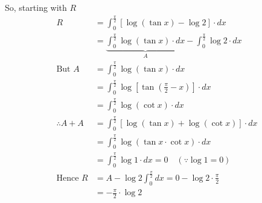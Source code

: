 \documentclass[14pt,fleqn]{extarticle}
\begin{document}
So, starting with $R$ 
\begin{align}
R &= \int_0^{\frac\pi{2}} \left[\log \left(\tan x \right) - \log 2 \right]\cdot dx \\
&= \underbrace{\int_0^{\frac\pi{2}}\log \left(\tan x \right)\cdot dx}_{A} - \int_0^{\frac\pi{2}}\log 2\cdot dx \\
\text{But } A &= \int_0^{\frac\pi{2}}\log \left(\tan x \right)\cdot dx 
\\
&=\int_0^{\frac\pi{2}}\log \left[\tan \left(\frac\pi{2} - x \right)\right] \cdot dx \\
&= \int_0^{\frac\pi{2}}\log \left(\cot x \right)\cdot dx  \\
\therefore A + A  &= \int_0^{\frac\pi{2}} \left[\log \left(\tan x \right) + \log \left(\cot x \right) \right]\cdot dx \\
&= \int_0^{\frac\pi{2}} \log \left(\tan x\cdot \cot x \right)\cdot dx \\ 
&= \int_0^{\frac\pi{2}} \log 1\cdot dx = 0 \quad (\because \log 1 = 0) \\
\text{Hence } R &= A - \log 2\int_0^{\frac\pi{2}} dx = 0 - \log 2\cdot \frac\pi{2} \\
&= -\frac\pi{2}\cdot \log 2 
\end{align}
\end{document}
